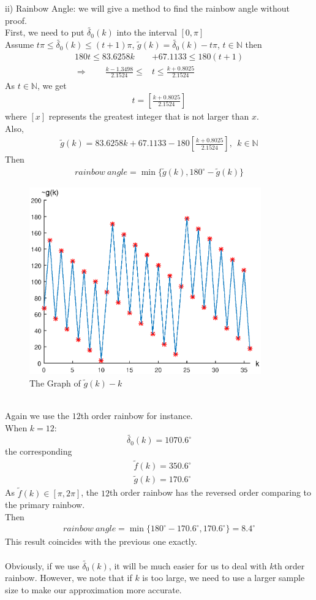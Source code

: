 \documentclass{article}
\begin{document}
\begin{spacing}{1.5}
ii) Rainbow Angle: we will give a method to find the rainbow angle without proof.\\
First, we need to put $\tilde{\delta_0}(k)$ into the interval $[0,\pi]$\\
Assume $t\pi\leq \tilde{\delta_0}(k)\leq (t+1)\pi$, $\tilde{g}(k)=\tilde{\delta_0}(k)-t\pi$, $t\in\mathbb{N}$ then \begin{align*}
180t\leq 83.6258k&+67.1133\leq 180(t+1)\\
\Rightarrow \qquad\frac{k-1.3498}{2.1524}\leq &t \leq \frac{k+0.8025}{2.1524}
\end{align*}
As $t\in\mathbb{N}$, we get \begin{align*}
t=[\frac{k+0.8025}{2.1524}]
\end{align*}
where $[x]$ represents the greatest integer that is not larger than $x$.\\
Also,
\begin{align*}
\tilde{g}(k)=83.6258k+67.1133-180[\frac{k+0.8025}{2.1524}], \ \ k\in\mathbb{N}
\end{align*}
Then \begin{align*}
rainbow\ angle=\min\{\tilde{g}(k),180^{\circ}-\tilde{g}(k)\}
\end{align*}
\begin{figure}[!htb]
\centering
\includegraphics[width=10cm]{Figure7.eps}
\caption{The Graph of $\tilde{g}(k)-k$}
\end{figure}
\\
Again we use the $12$th order rainbow for instance. \\
When $k=12$:
$$\tilde{\delta_0}(k)=1070.6^{\circ}$$
the corresponding
\begin{align*}&\tilde{f}(k)=350.6^{\circ}\\
&\tilde{g}(k)=170.6^{\circ}\end{align*}
As $\tilde{f}(k)\in [\pi,2\pi]$, the $12$th order rainbow has the reversed order comparing to the primary rainbow.\\
Then \begin{align*}
rainbow\ angle=\min\{180^{\circ}-170.6^{\circ},170.6^{\circ}\}=8.4^{\circ} 
\end{align*}
This result coincides with the previous one exactly.\\
\\
Obviously, if we use $\tilde{\delta_0}(k)$, it will be much easier for us to deal with $k$th order rainbow. However, we note that if $k$ is too large, we need to use a larger sample size to make our approximation more accurate.

\end{spacing}
\end{document}
